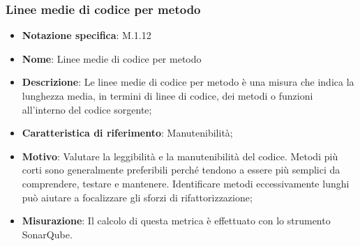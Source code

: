 \subsubsection{Linee medie di codice per metodo}
\begin{itemize}
    \item \textbf{Notazione specifica}: M.1.12
    \item \textbf{Nome}: Linee medie di codice per metodo
    \item \textbf{Descrizione}: Le linee medie di codice per metodo è una misura che indica la lunghezza media, in termini di linee di codice, dei metodi o funzioni all'interno del codice sorgente;
    \item \textbf{Caratteristica di riferimento}: Manutenibilità;
    \item \textbf{Motivo}: Valutare la leggibilità e la manutenibilità del codice. Metodi più corti sono generalmente preferibili perché tendono a essere più semplici da comprendere, testare e mantenere. Identificare metodi eccessivamente lunghi può aiutare a focalizzare gli sforzi di rifattorizzazione;
    \item \textbf{Misurazione}: Il calcolo di questa metrica è effettuato con lo strumento SonarQube.
\end{itemize}

